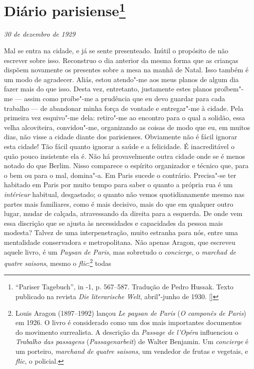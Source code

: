 \chapter{Diário parisiense\footnote[*]{``Pariser Tagebuch'', in -1, p.
  567--587. Tradução de Pedro Hussak. Texto publicado na revista \emph{Die literarische Welt}, abril"-junho de 1930. []}}

\begin{flushright}
\emph{30 de dezembro de 1929}
\end{flushright}

\noindent{}Mal se entra na cidade, e já se sente
presenteado. Inútil o propósito de não escrever sobre isso.
Reconstruo o dia anterior da mesma forma que as crianças dispõem
novamente os presentes sobre a mesa na manhã de Natal. Isso também é um
modo de agradecer. Aliás, estou atendo"-me aos meus planos de algum dia
fazer mais do que isso. Desta vez, entretanto, justamente estes planos
proíbem"-me --- assim como proíbe"-me a prudência que eu devo guardar para
cada trabalho --- de abandonar minha força de vontade e entregar"-me à
cidade. Pela primeira vez esquivo"-me dela: retiro"-me ao encontro para o
qual a solidão, essa velha alcoviteira, convidou"-me, organizando as
coisas de modo que eu, em muitos dias, não visse a cidade diante dos
parisienses. Obviamente não é fácil ignorar esta cidade! Tão fácil quanto
ignorar a saúde e a felicidade. É inacreditável o quão pouco insistente
ela é. Não há provavelmente outra cidade onde se é menos notado
do que Berlim. Nisso comparece o espírito organizador e
técnico que, para o bem ou para o mal, domina"-a. Em Paris sucede o
contrário. Precisa"-se ter habitado em Paris por muito tempo para saber o
quanto a própria rua é um \emph{intérieur} habitual, desgastado;
o quanto não vemos quotidianamente mesmo nas partes mais
familiares, como é mais decisivo, mais do que em qualquer outro lugar, mudar de
calçada, atravessando da direita para a esquerda. De onde vem essa discrição
que se ajusta às necessidades e capacidades da pessoa mais modesta?
Talvez de uma interpenetração, muito estranha para nós, entre uma
mentalidade conservadora e metropolitana. Não apenas Aragon, que
escreveu aquele livro, é um \emph{Paysan de Paris}, mas sobretudo o
\emph{concierge}, o \emph{marchad de quatre saisons}, mesmo o
\emph{flic}:\footnote{Louis Aragon (1897--1992) lançou \emph{Le paysan de Paris} (\emph{O camponês de Paris}) em 1926. O livro é considerado como um dos mais importantes documentos do movimento surrealista. A descrição da \emph{Passage de l'Opéra} influenciou o \emph{Trabalho das passagens} (\emph{Passagenarbeit}) de Walter Benjamin. Um \emph{concierge} é um porteiro, \emph{marchand de quatre saisons}, um vendedor de frutas e vegetais, e \emph{flic}, o policial. \versal{[N.~O.]}} todas
